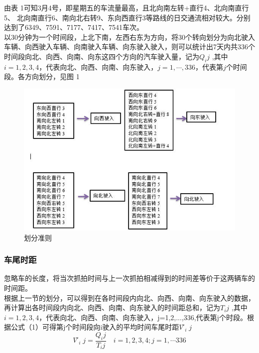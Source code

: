 \documentclass[UTF8]{article}
\begin{document}
    由表 1可知3月4号，即星期五的车流量最高，且北向南左转+直行4、北向南直行5、
    北向南直行6、南向北右转9、东向西直行3等路线的日交通流相对较大。分别达到了6349、7591、7177、7417、7541车次。\\
    以30分钟为一个时间段，上北下南，左西右东为方向，将30个转向划分为向北驶入车辆、向西驶入车辆、向南驶入车辆、向东驶入驶入，则可以统计出7天内共336个时间段向北、向西、向南、向东这四个方向的汽车驶入量，记为$Q_ij$  ,其中$i=1,2,3,4$，代表向北、向西、向南、向东驶入，$j=1,⋯,336$，代表第$j$个时间段。各方向划分，见图 1\\
    \begin{figure}[H]
        \includegraphics[width=\linewidth]{1.jpg}
        \caption{划分准则}
        \label{fig:ph1}
    \end{figure}
    \subsubsection{车尾时距}
        忽略车的长度，将当次抓拍时间与上一次抓拍相减得到的时间差等价于这两辆车的时间距。\\
    根据上一节的划分，可以得到在各时间段内向北、向西、向南、向东驶入的数据，再计算出各时间段内向北、向西、向南、向东驶入的时间距总和，记为$T_ij$  ,其中$i=1,2,3,4$，代表向北、向西、向南、向东驶入，j=1,2,...,336,代表第j个时段。根据公式（1）可得第j个时间段向i驶入的平均时间车尾时距$V ̃_ij$\\
    \begin{equation}
        V ̃_ij=\frac{Q_ij}{T_ij} \quad i=1,2,3,4; j=1,⋯336	
    \end{equation}
        
\end{document}
